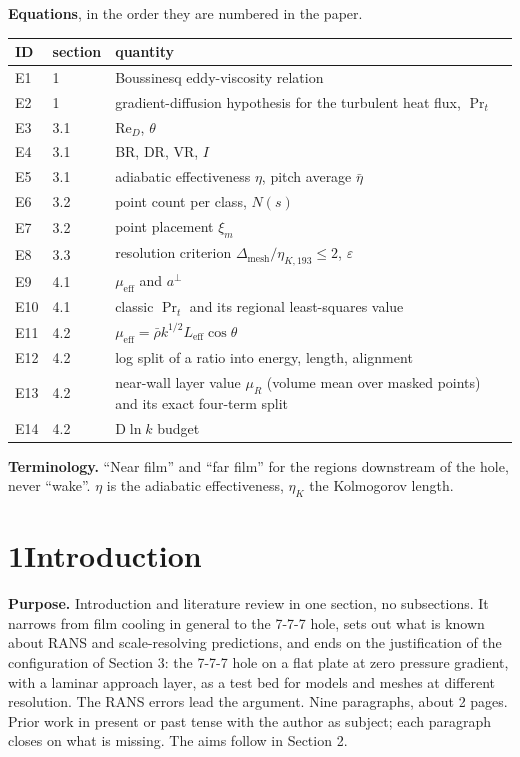 \documentclass[10pt]{article}
\newcommand{\deta}{\Delta_{\mathrm{mesh}}/\eta_{K,193}}
\begin{document}
\textbf{Equations}, in the order they are numbered in the paper.\par
{\centering\footnotesize
\begin{tabular}{@{}l l l@{}}
\toprule
ID & section & quantity \\
\midrule
E1 & 1 & Boussinesq eddy-viscosity relation \\
E2 & 1 & gradient-diffusion hypothesis for the turbulent heat flux, $\Pr_t$ \\
E3 & 3.1 & $\mathrm{Re}_D$, $\theta$ \\
E4 & 3.1 & BR, DR, VR, $I$ \\
E5 & 3.1 & adiabatic effectiveness $\eta$, pitch average $\bar\eta$ \\
E6 & 3.2 & point count per class, $N(s)$ \\
E7 & 3.2 & point placement $\xi_m$ \\
E8 & 3.3 & resolution criterion $\deta\le2$, $\varepsilon$ \\
E9 & 4.1 & $\mu_{\mathrm{eff}}$ and $a^\perp$ \\
E10 & 4.1 & classic $\Pr_t$ and its regional least-squares value \\
E11 & 4.2 & $\mu_{\mathrm{eff}}=\bar\rho k^{1/2}L_{\mathrm{eff}}\cos\theta$ \\
E12 & 4.2 & log split of a ratio into energy, length, alignment \\
E13 & 4.2 & near-wall layer value $\mu_R$ (volume mean over masked points) and its exact four-term split \\
E14 & 4.2 & $\mathrm D\ln k$ budget \\
\bottomrule
\end{tabular}\par}

\textbf{Terminology.} ``Near film'' and ``far film'' for the regions downstream of the hole, never ``wake''.
$\eta$ is the adiabatic effectiveness, $\eta_K$ the Kolmogorov length.

\section*{1\quad Introduction}
\textbf{Purpose.} Introduction and literature review in one section, no subsections. It narrows from film
cooling in general to the 7-7-7 hole, sets out what is known about RANS and scale-resolving predictions, and
ends on the justification of the configuration of Section 3: the 7-7-7 hole on a flat plate at zero pressure
gradient, with a laminar approach layer, as a test bed for models and meshes at different resolution. The RANS
errors lead the argument. Nine paragraphs, about 2 pages. Prior work in present or past
tense with the author as subject; each paragraph closes on what is missing. The aims follow in Section 2.
\end{document}
